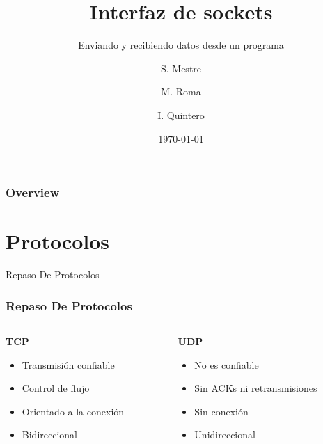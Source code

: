 \documentclass{beamer}
\title[Sockets]{Interfaz de sockets}
\subtitle{Enviando y recibiendo datos desde un programa}
\author{S. Mestre \and M. Roma \and I. Quintero}
\institute[IPS UNR]{Instituto Politecnico Superior}
\date{\today}
\begin{document}
\begin{frame}
\titlepage
\end{frame}

\begin{frame}
\frametitle{Overview}
\tableofcontents
\end{frame}


\section{Protocolos}

\begin{frame}
\huge{\centerline{Repaso De Protocolos}}
\end{frame}


\begin{frame}
    \frametitle{Repaso De Protocolos}
    \begin{columns}
        \begin{column}{0.5\textwidth}
            \textbf{TCP}
            \begin{itemize}
                \item Transmisi\'on confiable
                \item Control de flujo
                \item Orientado a la conexi\'on
                \item Bidireccional
            \end{itemize}
        \end{column}
        \begin{column}{0.5\textwidth}
            \textbf{UDP}
            \begin{center}
                \begin{itemize}
                    \item No es confiable
                    \item Sin ACKs ni retransmisiones
                    \item Sin conexi\'on
                    \item Unidireccional
                \end{itemize}
            \end{center}
        \end{column}
    \end{columns}
\end{frame}
\end{document}
